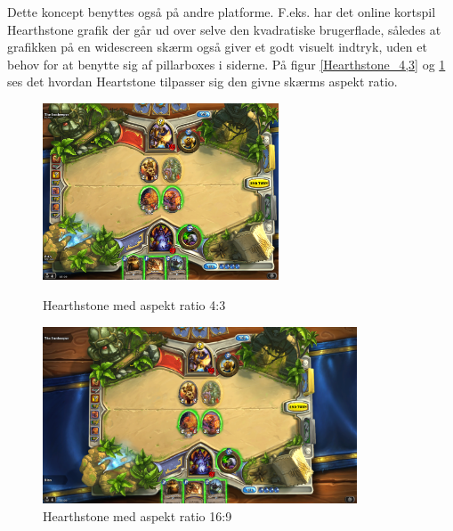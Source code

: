 \documentclass[Main.tex]{AspectRatio.tex}
\begin{document}
Dette koncept benyttes også på andre platforme. F.eks. har det online kortspil Hearthstone \cite{HSGame} grafik der går ud over selve den kvadratiske brugerflade, således at grafikken på en widescreen skærm også giver et godt visuelt indtryk, uden et behov for at benytte sig af pillarboxes i siderne. På figur \ref{Hearthstone_4,3} og \ref{Hearthstone_16,9} ses det hvordan Heartstone tilpasser sig den givne skærms aspekt ratio.

\begin{figure}[h]
\centering
\parbox{7cm}{
\includegraphics[width = 7cm]{billeder/Heathstone_4,3}
\caption{Hearthstone med aspekt ratio 4:3}
\label{Hearthstone_4,3}}
\qquad
\begin{minipage}{9.33cm}
\includegraphics[width = 9.33cm]{billeder/Heathstone_16,9}
\caption{Hearthstone med aspekt ratio 16:9}
\label{Hearthstone_16,9}
\end{minipage}
\end{figure}
\end{document}
